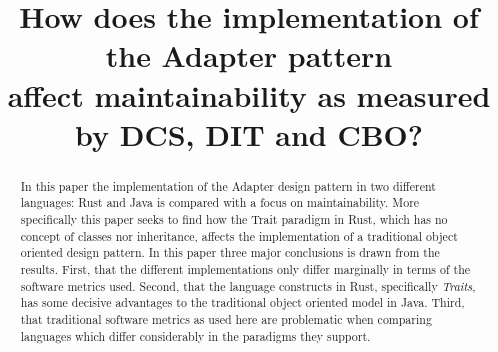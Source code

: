 \documentclass[conference]{IEEEtran}
\begin{document}
%
\title{How does the implementation of the Adapter pattern\\ affect maintainability as measured by DCS, DIT and CBO?}


\author{
}


\maketitle

\begin{abstract}
    In this paper the implementation of the Adapter design pattern in two different languages: Rust and Java is compared with a focus on maintainability.
    More specifically this paper seeks to find how the Trait paradigm in Rust, which has no concept of classes nor inheritance, affects the implementation of a traditional object oriented design pattern.
    In this paper three major conclusions is drawn from the results.
    First, that the different implementations only differ marginally in terms of the software metrics used.
    Second, that the language constructs in Rust, specifically \emph{Traits}, has some decisive advantages to the traditional object oriented model in Java.
    Third, that traditional software metrics as used here are problematic when comparing languages which differ considerably in the paradigms they support.
\end{abstract}


%
\IEEEpeerreviewmaketitle
\end{document}
